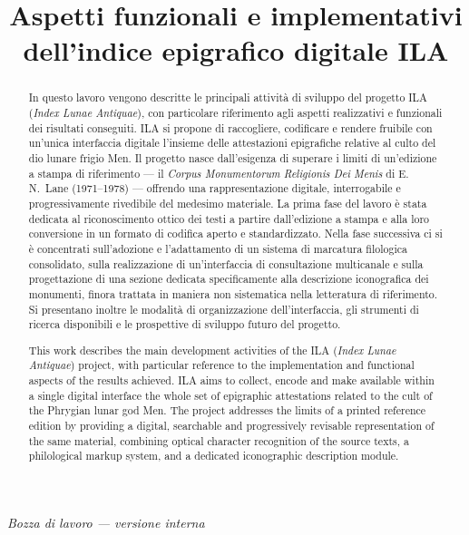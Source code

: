 \documentclass[11pt,a4paper]{article}
\title{\textbf{Aspetti funzionali e implementativi dell'indice epigrafico digitale ILA}}
\author{}
\date{}
\begin{document}
\maketitle
\vspace{-2.5em}

\begin{center}
\textit{Bozza di lavoro --- versione interna}
\end{center}

\vspace{1.5em}

\begin{abstract}
\noindent
In questo lavoro vengono descritte le principali attività di sviluppo del
progetto ILA (\textit{Index Lunae Antiquae}), con particolare riferimento
agli aspetti realizzativi e funzionali dei risultati conseguiti. ILA si
propone di raccogliere, codificare e rendere fruibile con un'unica
interfaccia digitale l'insieme delle attestazioni epigrafiche relative al
culto del dio lunare frigio Men. Il progetto nasce dall'esigenza di
superare i limiti di un'edizione a stampa di riferimento --- il
\textit{Corpus Monumentorum Religionis Dei Menis} di E.\,N.\ Lane
(1971--1978) --- offrendo una rappresentazione digitale, interrogabile e
progressivamente rivedibile del medesimo materiale. La prima fase del
lavoro è stata dedicata al riconoscimento ottico dei testi a partire
dall'edizione a stampa e alla loro conversione in un formato di codifica
aperto e standardizzato. Nella fase successiva ci si è concentrati
sull'adozione e l'adattamento di un sistema di marcatura filologica
consolidato, sulla realizzazione di un'interfaccia di consultazione
multicanale e sulla progettazione di una sezione dedicata specificamente
alla descrizione iconografica dei monumenti, finora trattata in maniera
non sistematica nella letteratura di riferimento. Si presentano inoltre
le modalità di organizzazione dell'interfaccia, gli strumenti di ricerca
disponibili e le prospettive di sviluppo futuro del progetto.

\medskip
\noindent
This work describes the main development activities of the ILA
(\textit{Index Lunae Antiquae}) project, with particular reference to the
implementation and functional aspects of the results achieved. ILA aims
to collect, encode and make available within a single digital interface
the whole set of epigraphic attestations related to the cult of the
Phrygian lunar god Men. The project addresses the limits of a printed
reference edition by providing a digital, searchable and progressively
revisable representation of the same material, combining optical
character recognition of the source texts, a philological markup system,
and a dedicated iconographic description module.
\end{abstract}
\end{document}

